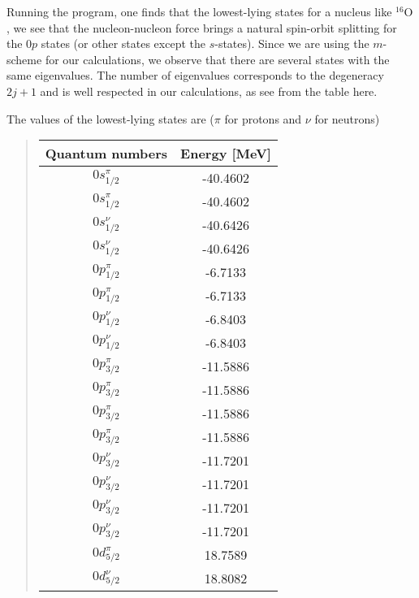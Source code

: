 \documentclass[%
oneside,                 %
final,                   %
10pt]{article}
\newenvironment{doconceexercise}{}{}
\begin{document}
\begin{doconceexercise}
\begin{verbatim}
\end{verbatim}

Running the program, one finds that the lowest-lying states for a nucleus like $^{16}\mbox{O}$, we see that the nucleon-nucleon force brings a natural spin-orbit splitting for the $0p$ states (or other states except the $s$-states).
Since we are using the $m$-scheme for our calculations, we observe that there are several states with the same
eigenvalues. The number of eigenvalues corresponds to the degeneracy $2j+1$ and is well respected in our calculations, as see from the table here.

The values of the lowest-lying states are ($\pi$ for protons and $\nu$ for neutrons)

\begin{quote}
\begin{tabular}{cc}
\hline
\multicolumn{1}{c}{ Quantum numbers } & \multicolumn{1}{c}{ Energy [MeV] } \\
\hline
$0s_{1/2}^{\pi}$ & -40.4602     \\
$0s_{1/2}^{\pi}$ & -40.4602     \\
$0s_{1/2}^{\nu}$ & -40.6426     \\
$0s_{1/2}^{\nu}$ & -40.6426     \\
$0p_{1/2}^{\pi}$ & -6.7133      \\
$0p_{1/2}^{\pi}$ & -6.7133      \\
$0p_{1/2}^{\nu}$ & -6.8403      \\
$0p_{1/2}^{\nu}$ & -6.8403      \\
$0p_{3/2}^{\pi}$ & -11.5886     \\
$0p_{3/2}^{\pi}$ & -11.5886     \\
$0p_{3/2}^{\pi}$ & -11.5886     \\
$0p_{3/2}^{\pi}$ & -11.5886     \\
$0p_{3/2}^{\nu}$ & -11.7201     \\
$0p_{3/2}^{\nu}$ & -11.7201     \\
$0p_{3/2}^{\nu}$ & -11.7201     \\
$0p_{3/2}^{\nu}$ & -11.7201     \\
$0d_{5/2}^{\pi}$ & 18.7589      \\
$0d_{5/2}^{\nu}$ & 18.8082      \\
\hline
\end{tabular}
\end{quote}


\end{doconceexercise}
\end{document}
